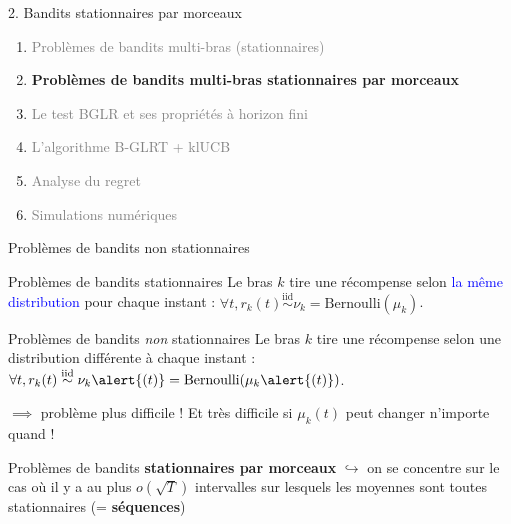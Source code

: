\documentclass[11pt,french,ignorenonframetext,]{beamer}
\begin{document}
\begin{frame}{2. Bandits stationnaires par morceaux}

  \begin{enumerate}
    \item
    \textcolor{gray}{
      Problèmes de bandits multi-bras (stationnaires)
    }
    \vspace*{15pt}

    \item
    \alert{\textbf{%
      Problèmes de bandits multi-bras stationnaires par morceaux
    }}
    \vspace*{15pt}

    \item
    \textcolor{gray}{
      Le test BGLR et ses propriétés à horizon fini
    }
    \vspace*{15pt}

    \item
    \textcolor{gray}{
      L'algorithme B-GLRT + klUCB
    }
    \vspace*{15pt}

    \item
    \textcolor{gray}{
      Analyse du regret
    }
    \vspace*{15pt}

    \item
    \textcolor{gray}{
      Simulations numériques
    }
  \end{enumerate}

\end{frame}


\begin{frame}{Problèmes de bandits non stationnaires}

  \begin{block}{Problèmes de bandits stationnaires}
    Le bras $k$ tire une récompense selon \textcolor{blue}{la même distribution} pour chaque instant :
    $\forall t, r_k(t) \overset{\text{iid}}{\sim} \nu_k = \mathrm{Bernoulli}(\mu_k)$.
  \end{block}

  \pause
  \begin{alertblock}{Problèmes de bandits \emph{non} stationnaires}
    Le bras $k$ tire une récompense selon \alert{une distribution différente à chaque instant} :
    $\forall t, r_k(t) \overset{\text{iid}}{\sim} \nu_k\alert{(t)} = \mathrm{Bernoulli}(\mu_k\alert{(t)})$.
  \end{alertblock}

  $\implies$ \dXey{} problème plus difficile !
  Et très difficile si $\mu_k(t)$ peut changer n'importe quand !

  \pause
  \begin{block}{Problèmes de bandits \textbf{stationnaires par morceaux}}
    $\hookrightarrow$ on se concentre sur le cas où il y a au plus $o(\sqrt{T})$ intervalles sur lesquels les moyennes sont toutes stationnaires (= \textbf{séquences})
  \end{block}
\end{frame}
\end{document}
